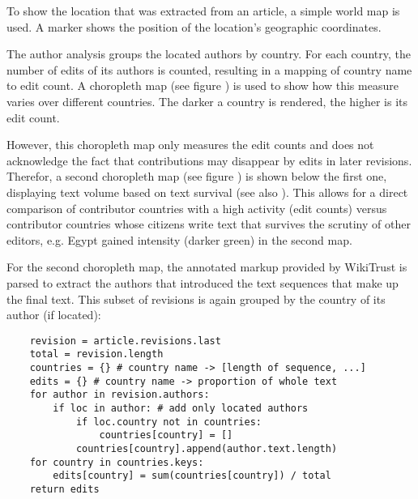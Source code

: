 To show the location that was extracted from an article, a simple world map is used.
A marker shows the position of the location's geographic coordinates.


The author analysis groups the located authors by country. 
For each country, the number of edits of its authors is counted, resulting in a mapping of country name to edit count.
A choropleth map (see figure ) is used to show how this measure varies over different countries.
The darker a country is rendered, the higher is its edit count.


However, this choropleth map only measures the edit counts and does not acknowledge the fact that contributions may disappear by edits in later revisions. 
Therefor, a second choropleth map (see figure ) is shown below the first one, displaying text volume  based on text survival (see also ).
This allows for a direct comparison of contributor countries with a high activity (edit counts) versus contributor countries whose citizens write text that survives the scrutiny of other editors, e.g. Egypt gained intensity (darker green) in the second map.


For the second choropleth map, the annotated markup provided by WikiTrust is parsed to extract the authors that introduced the text sequences that make up the final text.
This subset of revisions is again grouped by the country of its author (if located):

\begin{lstlisting}
	revision = article.revisions.last
	total = revision.length
	countries = {} # country name -> [length of sequence, ...]
	edits = {} # country name -> proportion of whole text
	for author in revision.authors:
		if loc in author: # add only located authors
			if loc.country not in countries:
				countries[country] = []
			countries[country].append(author.text.length)
	for country in countries.keys:
		edits[country] = sum(countries[country]) / total
	return edits
\end{lstlisting}


